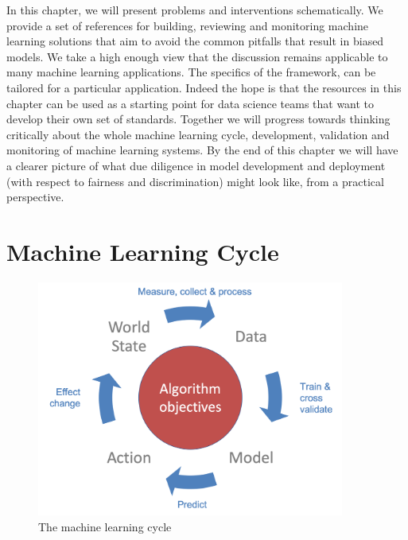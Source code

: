 In this chapter, we will present problems and interventions schematically. We provide a set of references for building, reviewing and monitoring machine learning solutions that aim to avoid the common pitfalls that result in biased models. We take a high enough view that the discussion remains applicable to many machine learning applications. The specifics of the framework, can be tailored for a particular application. Indeed the hope is that the resources in this chapter can be used as a starting point for data science teams that want to develop their own set of standards. Together we will progress towards thinking critically about the whole machine learning cycle, development, validation and monitoring of machine learning systems.  By the end of this chapter we will have a clearer picture of what due diligence in model development and deployment (with respect to fairness and discrimination) might look like, from a practical perspective.

\section{Machine Learning Cycle}

\begin{figure}[h!]
\centering
\includegraphics[width=0.9\textwidth]{02_EthicalDevelopment/figures/Fig_MLCycle.png}
\caption{The machine learning cycle}
\label{fig_MLCycle}
\end{figure}


